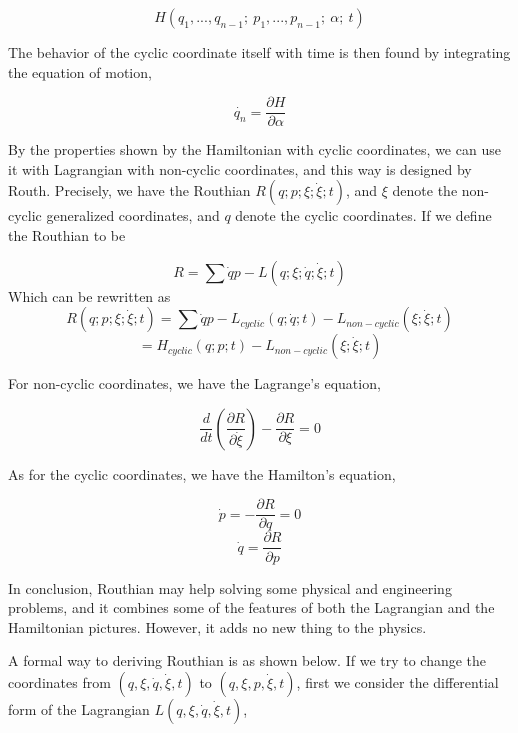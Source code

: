 \documentclass[12pt]{article}
\begin{document}
\begin{center}
    \[ H(q_1, ..., q_{n-1};\ p_1, ..., p_{n-1};\ \alpha;\ t) \]
\end{center}

The behavior of the cyclic coordinate itself with time is then found by integrating the equation of motion,

\begin{center}
    \[ \dot{q_n} = \frac{\partial H}{\partial \alpha} \]
\end{center}

By the properties shown by the Hamiltonian with cyclic coordinates, we can use it with Lagrangian with non-cyclic coordinates, and this way is designed by Routh. Precisely, we have the Routhian $R(q; p; \xi; \dot{\xi}; t)$, and $\xi$ denote the non-cyclic generalized coordinates, and $q$ denote the cyclic coordinates.
If we define the Routhian to be

\begin{center}
    \[ R = \sum{\dot{q}p} - L(q; \xi; \dot{q}; \dot{\xi}; t) \]
    Which can be rewritten as 
    \[ R(q;p;\xi;\dot{\xi};t) = \sum{\dot{q}p} - L_{cyclic}(q;\dot{q};t) - L_{non-cyclic}(\xi;\dot{\xi};t) \]
    \[ = H_{cyclic}(q;p;t) - L_{non-cyclic}(\xi;\dot{\xi};t) \]
\end{center}

For non-cyclic coordinates, we have the Lagrange's equation,

\begin{center}
    \[ \frac{d}{dt} \left( \frac{\partial R}{\partial \dot{\xi}} \right) - \frac{\partial R}{\partial \xi} = 0 \]
\end{center}

As for the cyclic coordinates, we have the Hamilton's equation,

\begin{center}
    \[ \dot{p} = -\frac{\partial R}{\partial q} = 0\]
    \[ \dot{q} = \frac{\partial R}{\partial p}\]
\end{center}

In conclusion, Routhian may help solving some physical and engineering problems, and it combines some of the features of both the Lagrangian and the Hamiltonian pictures. However, it adds no new thing to the physics.

A formal way to deriving Routhian is as shown below.
If we try to change the coordinates from $(q, \xi, \dot{q}, \dot{\xi}, t)$ to $(q, \xi, p, \dot{\xi}, t)$, first we consider the differential form of the Lagrangian $L(q, \xi, \dot{q}, \dot{\xi}, t)$,
\end{document}
